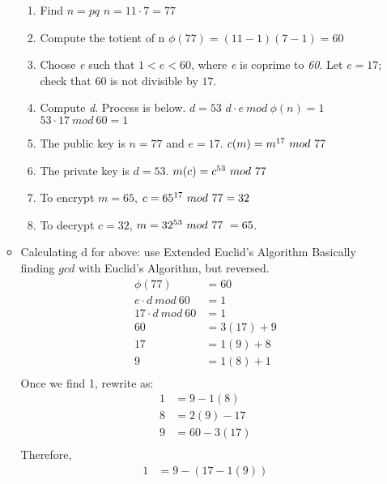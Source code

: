 \documentclass{article}
\begin{document}
\begin{itemize}
\begin{itemize}
\begin{enumerate}
          \item Find $ n = pq $
            \subitem $ n = 11 \cdot 7 = 77 $
          \item Compute the totient of n
            \subitem $ \phi(77) = (11 - 1)(7 - 1) = 60 $
          \item Choose \emph{e} such that $ 1 < e < 60 $, where \emph{e} is coprime to \emph{60}. 
            \subitem Let $ e = 17 $; check that $ 60 $ is not divisible by $ 17 $.
          \item Compute \emph{d}. Process is below.
            \subitem $ d = 53 $
            \subitem $ d \cdot e\ mod\ \phi(n) = 1 $
            \subitem $ 53 \cdot 17\ mod\ 60 = 1 $
          \item The public key is $ n = 77 $ and $ e = 17 $. 
            \subitem $ c(m) = m\textsuperscript{17}\ mod\ 77 $
          \item The private key is $ d = 53 $.
            \subitem $ m(c) = c\textsuperscript{53}\ mod\ 77 $
          \item To encrypt $ m = 65 $, 
            \subitem $ c = 65\textsuperscript{17}\ mod\ 77 = 32 $
          \item To decrypt $ c = 32 $, 
            \subitem $ m = 32\textsuperscript{53}\ mod\ 77\ = 65 $. 
        \end{enumerate}
      \item Calculating d for above: use Extended Euclid's Algorithm 
        \subitem Basically finding $ gcd $ with Euclid's Algorithm, but reversed.
        \begin{align*}
          \phi(77) &= 60 \\
          e \cdot d\ mod\ 60 &= 1 \\
          17 \cdot d\ mod\ 60 &= 1 \\
          60 &= 3(17) + 9 \\
          17 &= 1(9) + 8 \\
          9 &= 1(8) + 1 \\
        \end{align*}
        \subitem Once we find 1, rewrite as:
        \begin{align*}
          1 &= 9 - 1(8) \\
          8 &= 2(9) - 17 \\
          9 &= 60 - 3(17) \\
        \end{align*}
        \subitem Therefore,
        \begin{align*}
          1 &= 9 - (17 - 1(9)) \\

\end{align*}
\end{itemize}
\end{itemize}
\end{document}
